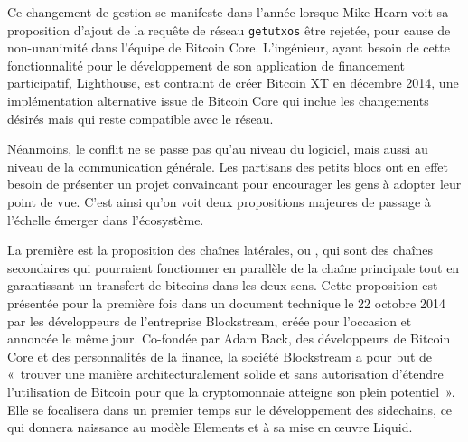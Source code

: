 Ce changement de gestion se manifeste dans l'année lorsque Mike Hearn voit sa proposition d'ajout de la requête de réseau \verb?getutxos? être rejetée, pour cause de non-unanimité dans l'équipe de Bitcoin Core. L'ingénieur, ayant besoin de cette fonctionnalité pour le développement de son application de financement participatif, Lighthouse, est contraint de créer Bitcoin XT en décembre 2014, une implémentation alternative issue de Bitcoin Core qui inclue les changements désirés mais qui reste compatible avec le réseau.

Néanmoins, le conflit ne se passe pas qu'au niveau du logiciel, mais aussi au niveau de la communication générale. Les partisans des petits blocs ont en effet besoin de présenter un projet convaincant pour encourager les gens à adopter leur point de vue. C'est ainsi qu'on voit deux propositions majeures de passage à l'échelle émerger dans l'écosystème.

La première est la proposition des chaînes latérales, ou , qui sont des chaînes secondaires qui pourraient fonctionner en parallèle de la chaîne principale tout en garantissant un transfert de bitcoins dans les deux sens. Cette proposition est présentée pour la première fois dans un document technique le 22 octobre 2014 par les développeurs de l'entreprise Blockstream, créée pour l'occasion et annoncée le même jour. Co-fondée par Adam Back, des développeurs de Bitcoin Core et des personnalités de la finance, la société Blockstream a pour but de «~trouver une manière architecturalement solide et sans autorisation d'étendre l'utilisation de Bitcoin pour que la cryptomonnaie atteigne son plein potentiel~». Elle se focalisera dans un premier temps sur le développement des sidechains, ce qui donnera naissance au modèle Elements et à sa mise en œuvre Liquid.


